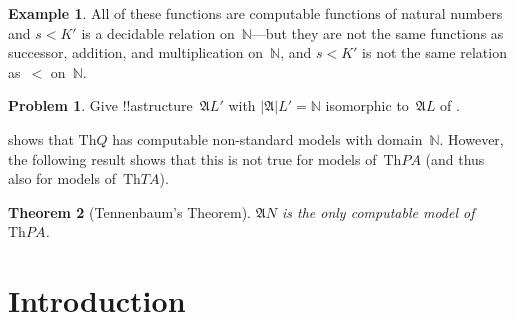 \documentclass[10pt,a4paper]{article}
\makeatletter
\theoremstyle{plain}
\newtheorem{thm}{Theorem}[section]
\theoremstyle{definition}
\newtheorem{ex}[thm]{Example}
\newtheorem{prob}{Problem}[section]
\theoremstyle{remark}
\newenvironment{explain}{}{}
\newcommand*{\olfileid}[3]{}
\newcommand{\olref}{\@ifnextchar[{\olref@i}{\olref@final}}
\def\olref@i[#1]{\@ifnextchar[{\olref@ii}{\olref@final}}
\def\olref@ii[#1]{\@ifnextchar[{\olref@iii}{\olref@final}}
\def\olref@iii[#1]{\olref@final}
\def\olref@final#1{\ref{#1}}
\providecommand{\Struct}{\ensuremath{\mathfrak{A}}}
\providecommand{\Domain}{\ensuremath{|\mathfrak{A}|}}
\providecommand{\Assign}{\ensuremath{s}}
\providecommand{\Th}{\ensuremath{\mathrm{Th}}}
\providecommand{\Nat}{\ensuremath{\mathbb{N}}}
\makeatother
\begin{document}
\begin{ex}
All of these functions are computable functions of natural numbers and
$\Assign{<}{K'}$ is a decidable relation on~$\Nat$---but they are not
the same functions as successor, addition, and multiplication
on~$\Nat$, and $\Assign{<}{K'}$ is not the same relation as~$<$
on~$\Nat$.
\end{ex}

\begin{prob}
Give !!a{structure}~$\Struct{L'}$ with $\Domain{L'} = \Nat$ isomorphic
to~$\Struct{L}$ of \olref[mod][mar][mdq]{ex:model-L-of-Q}.
\end{prob}

\begin{explain}
 shows that $\Th{Q}$ has computable
non-standard models with domain~$\Nat$.  However, the following result
shows that this is not true for models of~$\Th{PA}$ (and thus also for
models of~$\Th{TA}$).
\end{explain}

\begin{thm}[Tennenbaum's Theorem]
$\Struct{N}$ is the only computable model of~$\Th{PA}$.
\end{thm}
  




\olfileid{mod}{mar}{int}
\section{Introduction}
\end{document}
